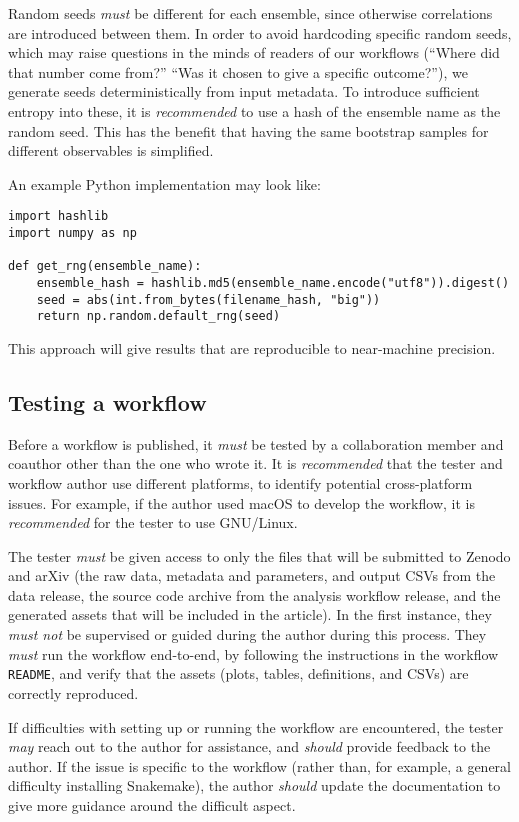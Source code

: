 \documentclass{article}
\newcommand\rfcword[1]{\emph{#1}\xspace}
\newcommand\must{\rfcword{must}}
\newcommand\mustnot{\rfcword{must not}}
\newcommand\should{\rfcword{should}}
\newcommand\recommended{\rfcword{recommended}}
\newcommand\may{\rfcword{may}}
\newcommand\filename[1]{\texttt{#1}\xspace}
\newcommand\readme{\filename{README}\xspace}
\begin{document}
Random seeds \must be different for each ensemble,
since otherwise correlations are introduced between them.
In order to avoid hardcoding specific random seeds,
which may raise questions in the minds of readers of our workflows
(``Where did that number come from?''
``Was it chosen to give a specific outcome?''),
we generate seeds deterministically from input metadata.
To introduce sufficient entropy into these,
it is \recommended to use a hash of the ensemble name as the random seed.
This has the benefit that
having the same bootstrap samples for different observables is simplified.

An example Python implementation may look like:

\begin{verbatim}
import hashlib
import numpy as np

def get_rng(ensemble_name):
    ensemble_hash = hashlib.md5(ensemble_name.encode("utf8")).digest()
    seed = abs(int.from_bytes(filename_hash, "big"))
    return np.random.default_rng(seed)
\end{verbatim}

This approach will give results that are reproducible to near-machine precision.

\subsection{Testing a workflow}\label{sec:testing}

Before a workflow is published,
it \must be tested by a collaboration member and coauthor other than the one who wrote it.
It is \recommended that the tester and workflow author use different platforms,
to identify potential cross-platform issues.
For example,
if the author used macOS to develop the workflow,
it is \recommended for the tester to use GNU/Linux.

The tester \must be given access to only the files that will be submitted to Zenodo and arXiv
(the raw data, metadata and parameters, and output CSVs from the data release,
the source code archive from the analysis workflow release,
and the generated assets that will be included in the article).
In the first instance,
they \mustnot be supervised or guided during the author during this process.
They \must run the workflow end-to-end,
by following the instructions in the workflow \readme,
and verify that the assets
(plots, tables, definitions, and CSVs)
are correctly reproduced.

If difficulties with setting up or running the workflow are encountered,
the tester \may reach out to the author for assistance,
and \should provide feedback to the author.
If the issue is specific to the workflow
(rather than,
for example,
a general difficulty installing Snakemake),
the author \should update the documentation to give more guidance around the difficult aspect.
\end{document}
